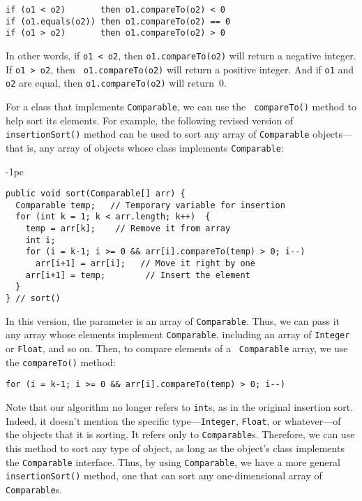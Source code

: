 \begin{jjjlisting}
\begin{lstlisting}
if (o1 < o2)       then o1.compareTo(o2) < 0
if (o1.equals(o2)) then o1.compareTo(o2) == 0
if (o1 > o2)       then o1.compareTo(o2) > 0
\end{lstlisting}
\end{jjjlisting}

\noindent In other words, if {\tt o1 < o2}, then {\tt o1.compareTo(o2)} 
will return a negative integer. If {\tt o1 > o2}, then {\tt
o1.compareTo(o2)} will return a positive integer. And if {\tt o1} and
{\tt o2} are equal, then {\tt o1.compareTo(o2)} will return~0.

For a class that implements {\tt Comparable}, we can use the \mbox{\tt
compareTo()} method to help sort its elements. For example, the
following revised version of {\tt insertionSort()} method can be used
to sort any array of {\tt Comparable} objects---that is, any array of
objects whose class implements {\tt Comparable}:

\begin{jjjlistingleft}[27pc]{-1pc}
\begin{lstlisting}
public void sort(Comparable[] arr) {
  Comparable temp;   // Temporary variable for insertion
  for (int k = 1; k < arr.length; k++)  {
    temp = arr[k];    // Remove it from array
    int i;
    for (i = k-1; i >= 0 && arr[i].compareTo(temp) > 0; i--) 
      arr[i+1] = arr[i];   // Move it right by one
    arr[i+1] = temp;        // Insert the element
  }
} // sort()
\end{lstlisting}
\end{jjjlistingleft}

\noindent In this version, the parameter is an array of
{\tt Comparable}. Thus, we can pass it any array whose elements
implement {\tt Comparable}, including an array of {\tt Integer} or
{\tt Float}, and so on.  Then, to compare elements of a {\tt
Comparable} array, we use the {\tt compareTo()} method:

\begin{jjjlisting}
\begin{lstlisting}
for (i = k-1; i >= 0 && arr[i].compareTo(temp) > 0; i--) 
\end{lstlisting}
\end{jjjlisting}

\noindent Note that our algorithm no longer refers to {\tt int}s, as
in the original insertion sort. Indeed, it doesn't mention the
specific type---{\tt Integer}, {\tt Float}, or whatever---of the
objects that it is sorting. It refers only to {\tt Comparable}s.
Therefore, we can use this method to sort any type of object, as long
as the object's class implements the {\tt Comparable} interface. Thus,
by using {\tt Comparable}, we have a more general {\tt
insertionSort()} method, one that can sort any one-dimensional array
of {\tt Comparable}s. 

